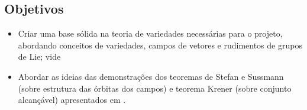 \documentclass[11pt]{amsart}
\newcommand{\<}[0]{\langle}
\renewcommand{\>}[0]{\rangle}
\begin{document}
  

 
\subsection{ Objetivos}
\begin{itemize}


\item Criar uma base sólida na  teoria de variedades necessárias para o projeto, abordando conceitos de 
variedades, campos de vetores  e rudimentos de grupos de Lie; vide \cite{AlexBettiol}


 
\item Abordar as ideias das demonstrações dos teoremas de  Stefan e Sussmann (sobre estrutura das órbitas dos campos)
 e teorema Krener (sobre conjunto alcançável) apresentados em \cite{Agrachev}.



\end{itemize}
\end{document}
